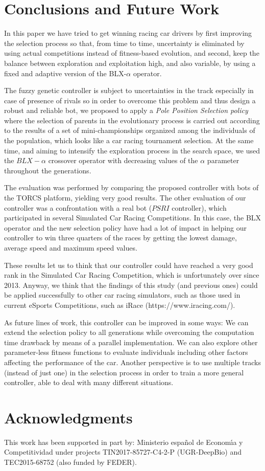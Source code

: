 \documentclass[conference]{IEEEtran}
\begin{document}
\section{Conclusions and Future Work} 
\label{sec:conclusions}



In this paper we have tried to get winning racing car drivers by
first improving the selection process so that, from time to time,
uncertainty is eliminated by using actual competitions instead of
fitness-based evolution, and second, keep the balance between
exploration and exploitation high, and also variable, by using a fixed
and adaptive version of the BLX-$\alpha$ operator.

The fuzzy genetic controller is subject to uncertainties in the track especially in case of presence of rivals so in order to overcome this problem and thus design a robust and reliable bot, we proposed to apply a \textit{Pole Position Selection policy} where the selection of parents in the evolutionary process is carried out according to the results of a set of mini-championships organized among the individuals of the population, which looks like a car racing tournament selection.
At the same time, and aiming to intensify the exploration process in the search space, we used the $BLX-\alpha$ crossover operator with decreasing values of the $\alpha$ parameter throughout the generations.

The evaluation was performed by comparing the proposed controller with bots of the TORCS platform, yielding very good results.
The other evaluation of our controller was a confrontation with a real bot ($PSRI$ controller), which participated in several Simulated Car Racing Competitions. In this case, the BLX operator and the new selection policy have had a lot of impact in helping our controller to win three quarters of the races by getting the lowest damage, average speed and maximum speed values.

These results let us to think that our controller could have reached a very good rank in the Simulated Car Racing Competition, which is unfortunately over since 2013. Anyway, we think that the findings of this study (and previous ones) could be applied successfully to other car racing simulators, such as those used in current eSports Competitions, such as iRace (https://www.iracing.com/).

As future lines of work, this controller can be improved in some ways:
We can extend the selection policy to all generations while overcoming the computation time drawback by means of a parallel implementation.
We can also explore other parameter-less fitness functions to evaluate individuals including other factors affecting the performance of the car.
Another perspective is to use multiple tracks (instead of just one) in the selection process in order to train a more general controller, able to deal with many different situations.

\section*{Acknowledgments}

This work has been supported in part by: Ministerio espa\~{n}ol de
Econom\'{\i}a y Competitividad under projects  TIN2017-85727-C4-2-P (UGR-DeepBio) and TEC2015-68752 (also funded by FEDER).



\end{document}
